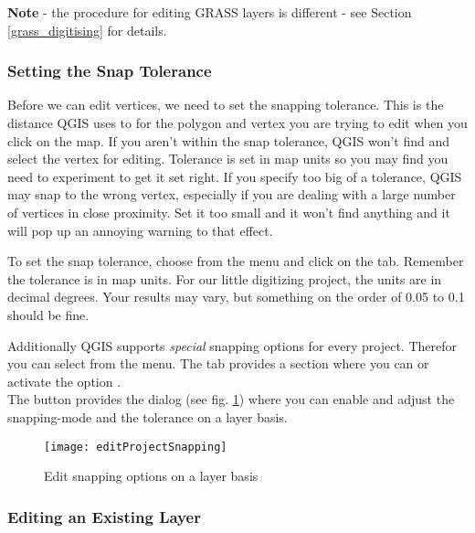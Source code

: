 \textbf{Note} - the procedure for editing GRASS layers is different - see
Section \ref{grass_digitising} for details.

\subsubsection{Setting the Snap Tolerance}

Before we can edit vertices, we need to set the snapping tolerance. This is the 
distance QGIS uses to  for the polygon and vertex you are trying to
edit when you click on the map. If you aren't within the snap tolerance,
QGIS won't find and select the vertex for editing. Tolerance is set in map
units so you may find you need to experiment to get it set right. If you
specify too big of a tolerance, QGIS may snap to the wrong vertex,
especially if you are dealing with a large number of vertices in close
proximity. Set it too small and it won't find anything and it will pop up an
annoying warning to that effect. 

To set the snap tolerance, choose  from the
 menu and click on the  tab.  Remember the
tolerance is in map units. For our little digitizing project, the units
are in decimal degrees.  Your results may vary, but something on the order
of 0.05 to 0.1 should be fine. 

Additionally QGIS supports {\em special} snapping options for every project.
Therefor you can select  from the  menu. The  tab
provides a section  where you can  or activate the option . \\
The button  provides the dialog  (see fig. \ref{fig:snappingoptions}) where you can enable and
adjust the snapping-mode and the tolerance on a layer basis.

\begin{figure}[H]
   \begin{center}
   \caption{Edit snapping options on a layer basis}\label{fig:snappingoptions}\smallskip
   \texttt{[image: editProjectSnapping]} 
\end{center}  
\end{figure}

\subsubsection{Editing an Existing Layer}
\label{sec:edit_existing_layer}

